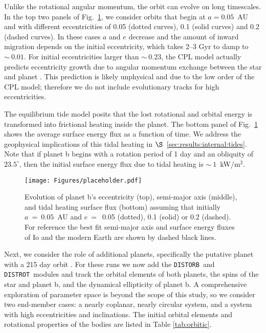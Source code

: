 \documentclass[preprint,12pt]{aastex}
\def\distorb{\texttt{\footnotesize{DISTORB}}\xspace}
\def\distrot{\texttt{\footnotesize{DISTROT}}\xspace}
\begin{document}
Unlike the rotational angular momentum, the orbit can evolve on long
timescales. In the top two panels of Fig.~\ref{fig:eqtide}, we
consider orbits that begin at $a=0.05$~AU and with different
eccentricities of 0.05 (dotted curves), 0.1 (solid curves) and 0.2
(dashed curves). In these cases $a$ and $e$ decrease and the amount of
inward migration depends on the initial eccentricity, which takes 2--3
Gyr to damp to $\sim~0.01$. For initial eccentricities larger than
$\sim~0.23$, the CPL model actually predicts eccentricity growth due
to angular momentum exchange between the star and planet
\citep{Barnes16}. This prediction is likely unphysical and due to the
low order of the CPL model; therefore we do not include evolutionary
tracks for high eccentricities.

The equilibrium tide model posits that the lost rotational and orbital
energy is transformed into frictional heating inside the planet. The
bottom panel of Fig.~\ref{fig:eqtide} shows the average surface energy
flux as a function of time. We address the geophysical implications of
this tidal heating in $\S$~\ref{sec:results:internal:tides}. Note that if planet
b begins with a rotation period of 1 day and an obliquity of
$23.5^\circ$, then the initial surface energy flux due to tidal
heating is $\sim~1$~kW/m$^{2}$.

\begin{figure} 
\begin{center}
\texttt{[image: Figures/placeholder.pdf]}
\end{center}
\caption{Evolution of planet b's eccentricity (top), semi-major axis
  (middle), and tidal heating surface flux (bottom) assuming that
  initially $a~=~0.05$~AU and $e~=$~0.05 (dotted), 0.1 (solid) or 0.2
  (dashed). For reference the best fit semi-major axis and surface
  energy fluxes of Io and the modern Earth are shown by dashed black
  lines.}
\label{fig:eqtide}
\end{figure}

Next, we consider the role of additional planets, specifically the
putative planet with a 215 day orbit \citep{AngladaEscude16}. For
these runs we now add the \distorb~and \distrot~modules and track the
orbital elements of both planets, the spins of the star and planet b,
and the dynamical ellipticity of planet b. A comprehensive exploration
of parameter space is beyond the scope of this study, so we consider
two end-member cases: a nearly coplanar, nearly circular system, and a
system with high eccentricities and inclinations. The initial orbital
elements and rotational properties of the bodies are listed in Table
\ref{tab:orbitic}.
\end{document}
